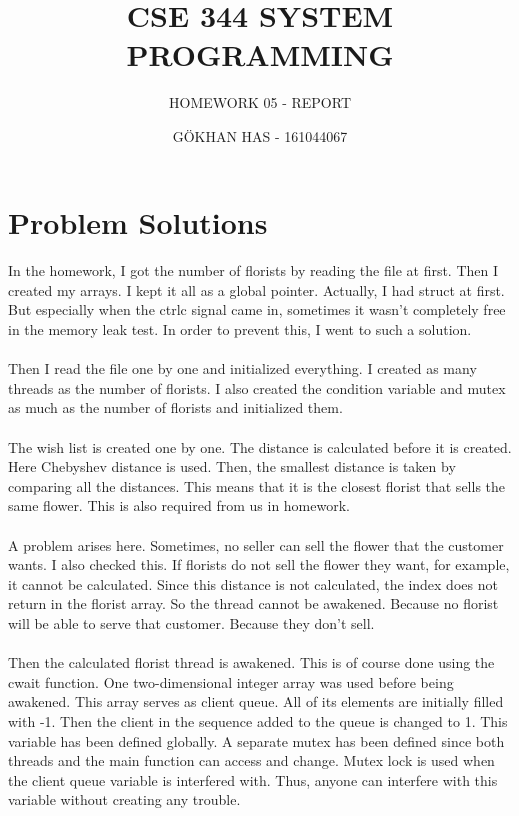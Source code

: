 \documentclass{article}
\title{CSE 344 SYSTEM PROGRAMMING}
\author{HOMEWORK 05 - REPORT }
\date{GÖKHAN HAS - 161044067}
\begin{document}
\maketitle

\section{Problem Solutions}
\paragraph{}
In the homework, I got the number of florists by reading the file at first. Then I created my arrays. I kept it all as a global pointer. Actually, I had struct at first. But especially when the ctrlc signal came in, sometimes it wasn't completely free in the memory leak test. In order to prevent this, I went to such a solution.

\paragraph{}
Then I read the file one by one and initialized everything. I created as many threads as the number of florists. I also created the condition variable and mutex as much as the number of florists and initialized them.

\paragraph{}
The wish list is created one by one. The distance is calculated before it is created. Here Chebyshev distance is used. Then, the smallest distance is taken by comparing all the distances. This means that it is the closest florist that sells the same flower. This is also required from us in homework.

\paragraph{}
A problem arises here. Sometimes, no seller can sell the flower that the customer wants. I also checked this. If florists do not sell the flower they want, for example, it cannot be calculated. Since this distance is not calculated, the index does not return in the florist array. So the thread cannot be awakened. Because no florist will be able to serve that customer. Because they don't sell.

\paragraph{}
Then the calculated florist thread is awakened. This is of course done using the cwait function. One two-dimensional integer array was used before being awakened. This array serves as client queue. All of its elements are initially filled with -1. Then the client in the sequence added to the queue is changed to 1. This variable has been defined globally. A separate mutex has been defined since both threads and the main function can access and change. Mutex lock is used when the client queue variable is interfered with. Thus, anyone can interfere with this variable without creating any trouble.
\end{document}

